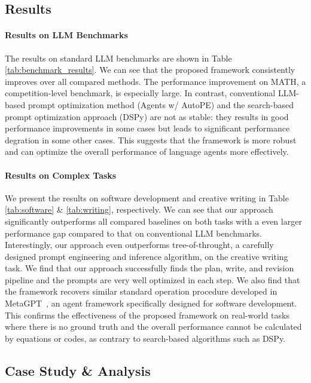 \subsection{Results}




\paragraph{Results on LLM Benchmarks}
The results on standard LLM benchmarks are shown in Table \ref{tab:benchmark_results}. We can see that the proposed \baby framework consistently improves over all compared methods. The performance improvement on MATH, a competition-level benchmark, is especially large. In contrast, conventional LLM-based prompt optimization method (Agents w/ AutoPE) and the search-based prompt optimization approach (DSPy) are not as stable: they results in good performance improvements in some cases but leads to significant performance degration in some other cases. This suggests that the \baby framework is more robust and can optimize the overall performance of language agents more effectively.


\paragraph{Results on Complex Tasks}
We present the results on software development and creative writing in Table \ref{tab:software} \& \ref{tab:writing}, respectively. We can see that our approach significantly outperforms all compared baselines on both tasks with a even larger performance gap compared to that on conventional LLM benchmarks. Interestingly, our approach even outperforms tree-of-throught, a carefully designed prompt engineering and inference algorithm, on the creative writing task. We find that our approach successfully finds the plan, write, and revision pipeline and the prompts are very well optimized in each step. We also find that the \baby framework recovers similar standard operation procedure developed in MetaGPT~\citep{hong2023metagpt}, an agent framework specifically designed for software development. This confirms the effectiveness of the proposed \baby framework on real-world tasks where there is no ground truth and the overall performance cannot be calculated by equations or codes, as contrary to search-based algorithms such as DSPy.

\subsection{Case Study \& Analysis}

